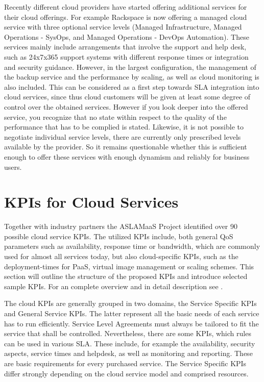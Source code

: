 Recently different cloud providers have started offering additional services for their cloud offerings. For example Rackspace\cite{rackspace15} is now offering a managed cloud service with three optional service levels (Managed Infrastructure, Managed Operations - SysOps, and Managed Operations - DevOps Automation). These services mainly include arrangements that involve the support and help desk, such as  24x7x365 support systems with different response times or integration and security guidance. However, in the largest configuration, the management of the backup service  and the performance by scaling, as well as cloud monitoring is also included. This can be considered as a first step towards SLA integration into cloud services, since thus cloud customers will be given at least some degree of control over the obtained services. However if you look deeper into the offered service, you recognize that no state within respect to the quality of the performance that has to be complied is stated. Likewise, it is not possible to negotiate individual service levels, there are currently only prescribed levels available by the provider. So it remains questionable whether this is sufficient enough to offer these services with enough dynamism and reliably for business users.




\section{KPIs for Cloud Services} \label{Cloud KPIs}
Together with industry partners the ASLAMaaS Project \cite{ASLAMaaS} identified over 90 possible cloud service KPIs.  The utilized KPIs include, both general QoS parameters such as availability, response time or bandwidth, which are commonly used for almost all services today, but also cloud-specific KPIs, such as the deployment-times for PaaS, virtual image management or scaling schemes. This section will outline the structure of the proposed KPIs and introduce selected sample KPIs. For an complete overview and in detail description see \cite{ASLAMaaSDoku}.

The cloud KPIs are generally grouped in two domains, the Service Specific KPIs and General Service KPIs. The latter represent all the basic needs of each service has to run efficiently. Service Level Agreements must always be tailored to fit the service that shall be controlled. Nevertheless, there are some KPIs, which rules can be used in various SLA.  These include, for example the availability, security aspects, service times and helpdesk, as well as monitoring and reporting. These are basic requirements for every purchased service. The Service Specific KPIs differ strongly depending on the cloud service model and comprised resources.

